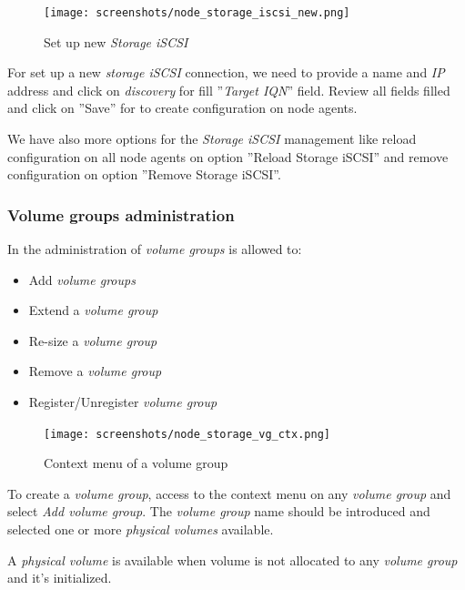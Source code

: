 \begin{figure}[H]
        \begin{center}
        \texttt{[image: screenshots/node\_storage\_iscsi\_new.png]}
        \caption{Set up new \emph{Storage iSCSI} }
        \label{fig:storage_iscsi_new}
        \end{center}
\end{figure}

For set up a new \emph{storage iSCSI} connection, we need to provide a name and \emph{IP} address and click on \emph{discovery} for fill ''\emph{Target IQN}'' field. Review all fields filled and click on ''Save'' for to create configuration on node agents.

We have also more options for the \emph{Storage iSCSI} management like reload configuration on all node agents on option ''Reload Storage iSCSI'' and remove configuration on option ''Remove Storage iSCSI''.


\subsubsection{Volume groups administration}
In the administration of \emph{volume groups} is allowed to:
\begin{itemize}
	\item Add \emph{volume groups}
	\item Extend a \emph{volume group}
	\item Re-size a \emph{volume group}
	\item Remove a \emph{volume group}
	\item Register/Unregister \emph{volume group}
\end{itemize}

\begin{figure}[H]
        \begin{center}
        \texttt{[image: screenshots/node\_storage\_vg\_ctx.png]}
        \caption{Context menu of a volume group}
        \label{fig:storage_vg_ctx}
        \end{center}
\end{figure}

To create a \emph{volume group}, access to the context menu on any \emph{volume group} and select \emph{Add volume group}.
The \emph{volume group} name should be introduced and selected one or more \emph{physical volumes} available.

A \emph{physical volume} is available when volume is not allocated to any \emph{volume group} and it's initialized.

